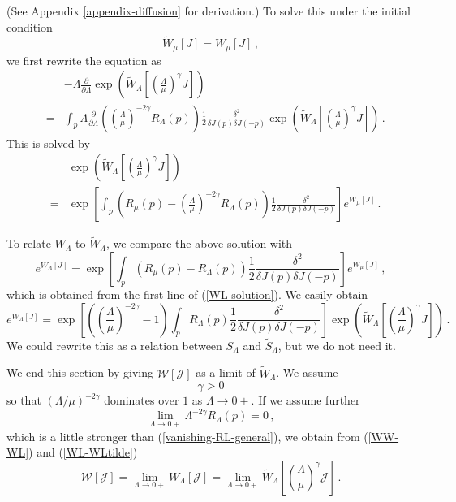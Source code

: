\documentclass[aps,prd,preprint,groupedaddress,preprintnumbers,longbibliography]{revtex4-1}
\newcommand{\nn}{\nonumber}
\newcommand{\SL}{S_\Lambda}
\newcommand{\WW}{\mathcal{W}}
\newcommand{\JJ}{\mathcal{J}}
\begin{document}
(See Appendix \ref{appendix-diffusion} for derivation.)  To solve this
under the initial condition
\begin{equation}
\tilde{W}_\mu [J] = W_\mu [J]\,,
\end{equation}
we first rewrite the equation as
\begin{eqnarray}
&&- \Lambda \frac{\partial}{\partial \Lambda} 
\exp \left( \tilde{W}_\Lambda \left[
    \left(\frac{\Lambda}{\mu}\right)^\gamma J \right] \right)\nn\\
&=& \int_p \Lambda \frac{\partial}{\partial \Lambda} \left(
\left(\frac{\Lambda}{\mu}\right)^{-2\gamma} R_\Lambda (p)\right) 
\frac{1}{2} \frac{\delta^2}{\delta J(p) \delta J(-p)} \exp \left(
  \tilde{W}_\Lambda \left[ 
    \left(\frac{\Lambda}{\mu}\right)^\gamma J \right] \right)\,.
\end{eqnarray}
This is solved by
\begin{eqnarray}
&&\exp \left( \tilde{W}_\Lambda \left[
    \left(\frac{\Lambda}{\mu}\right)^\gamma J \right] \right)\nn\\
&=& \exp \left[ \int_p \left( R_\mu (p) -
    \left(\frac{\Lambda}{\mu}\right)^{-2\gamma} R_\Lambda (p) \right)
  \frac{1}{2} \frac{\delta^2}{\delta J(p) \delta J(-p)} \right]
e^{W_\mu [J]}\,.
\end{eqnarray}

To relate $W_\Lambda$ to $\tilde{W}_\Lambda$, we compare the above
solution with
\begin{equation}
e^{W_\Lambda [J]} = \exp \left[ \int_p \left(R_\mu (p) - R_\Lambda
    (p)\right) \frac{1}{2} \frac{\delta^2}{\delta J(p) \delta J(-p)}
\right] e^{W_\mu [J]}\,,
\end{equation}
which is obtained from the first line of (\ref{WL-solution}).  We
easily obtain
\begin{equation}
e^{W_\Lambda [J]} =
\exp \left[ \left(\left(\frac{\Lambda}{\mu}\right)^{-2\gamma} - 1
  \right) \int_p R_\Lambda (p) \frac{1}{2} \frac{\delta^2}{\delta J(p)
    \delta J(-p)} \right] \exp \left( \tilde{W}_\Lambda \left[
    \left(\frac{\Lambda}{\mu}\right)^\gamma J \right] \right)\,.
\label{WL-WLtilde}
\end{equation}
We could rewrite this as a relation between $\SL$ and
$\tilde{S}_\Lambda$, but we do not need it.

We end this section by giving $\WW [\JJ]$ as a limit of
$\tilde{W}_\Lambda$.  We assume
\begin{equation}
\gamma > 0
\end{equation}
so that $(\Lambda/\mu)^{-2\gamma}$ dominates over $1$ as $\Lambda \to 0+$.
If we assume further
\begin{equation}
\lim_{\Lambda \to 0+} \Lambda^{-2\gamma} R_\Lambda (p) =
0\,,\label{vanishing-RL-gamma} 
\end{equation}
which is a little stronger than (\ref{vanishing-RL-general}), we
obtain from (\ref{WW-WL}) and (\ref{WL-WLtilde})
\begin{equation}
\WW [\JJ] = \lim_{\Lambda \to 0+} W_\Lambda [\JJ] = \lim_{\Lambda \to 0+}
\tilde{W}_\Lambda \left[ 
    \left(\frac{\Lambda}{\mu}\right)^\gamma \JJ \right]\,.
\label{WW-Wtilde}
\end{equation}
\end{document}
